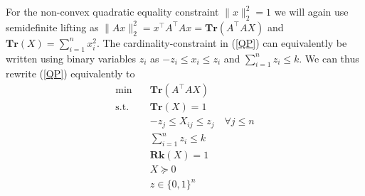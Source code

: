 \documentclass{elsarticle}
\newcommand{\T}{^{\top}}
\begin{document}
For the non-convex quadratic equality constraint $\|x\|_2^2 = 1$ we will
again use semidefinite lifting as $\|Ax\|_2^2 = x\T A\T Ax =
\textbf{Tr}(A\T A X)$ and $\textbf{Tr}(X) = \sum_{i=1}^n x_i^2$. 
The cardinality-constraint in (\ref{QP}) can equivalently be written using binary variables $z_i$ as $-z_i \leq x_i \leq z_i$ and $\sum_{i=1}^n z_i \leq k$. We can thus rewrite (\ref{QP}) equivalently to
% 
% 
\begin{align}\label{Rk1MISDP}
 \text{min} \quad & \textbf{Tr}(A\T A X) \nonumber \\
 \text{s.t.} \quad & \textbf{Tr}(X) = 1 \nonumber \\
 & -z_j \leq X_{ij} \leq z_j \quad \forall j \leq n \nonumber \\
 & \sum_{i=1}^n z_i \leq k \tag{Rk1MISDP} \\
 & \textbf{Rk}(X) = 1 \nonumber \\
 & X \succeq 0  \nonumber \\
 & z \in \{0,1\}^n \nonumber
\end{align}
\end{document}
